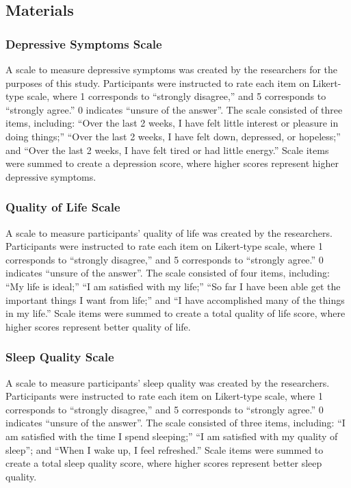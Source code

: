 \documentclass[man]{apa6}
\theoremstyle{definition}
\theoremstyle{definition}
\theoremstyle{definition}
\theoremstyle{remark}
\begin{document}
\subsection{Materials}\label{materials}

\subsubsection{Depressive Symptoms
Scale}\label{depressive-symptoms-scale}

A scale to measure depressive symptoms was created by the researchers
for the purposes of this study. Participants were instructed to rate
each item on Likert-type scale, where 1 corresponds to \enquote{strongly
disagree,} and 5 corresponds to \enquote{strongly agree.} 0 indicates
\enquote{unsure of the answer}. The scale consisted of three items,
including: \enquote{Over the last 2 weeks, I have felt little interest
or pleasure in doing things;} \enquote{Over the last 2 weeks, I have
felt down, depressed, or hopeless;} and \enquote{Over the last 2 weeks,
I have felt tired or had little energy.} Scale items were summed to
create a depression score, where higher scores represent higher
depressive symptoms.

\subsubsection{Quality of Life Scale}\label{quality-of-life-scale}

A scale to measure participants' quality of life was created by the
researchers. Participants were instructed to rate each item on
Likert-type scale, where 1 corresponds to \enquote{strongly disagree,}
and 5 corresponds to \enquote{strongly agree.} 0 indicates
\enquote{unsure of the answer}. The scale consisted of four items,
including: \enquote{My life is ideal;} \enquote{I am satisfied with my
life;} \enquote{So far I have been able get the important things I want
from life;} and \enquote{I have accomplished many of the things in my
life.} Scale items were summed to create a total quality of life score,
where higher scores represent better quality of life.

\subsubsection{Sleep Quality Scale}\label{sleep-quality-scale}

A scale to measure participants' sleep quality was created by the
researchers. Participants were instructed to rate each item on
Likert-type scale, where 1 corresponds to \enquote{strongly disagree,}
and 5 corresponds to \enquote{strongly agree.} 0 indicates
\enquote{unsure of the answer}. The scale consisted of three items,
including: \enquote{I am satisfied with the time I spend sleeping;}
\enquote{I am satisfied with my quality of sleep}; and \enquote{When I
wake up, I feel refreshed.} Scale items were summed to create a total
sleep quality score, where higher scores represent better sleep quality.
\end{document}
